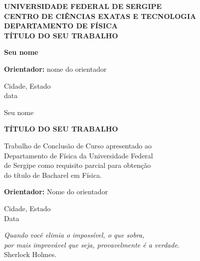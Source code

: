 \documentclass[12pt, a4paper, openright]{book}
\theoremstyle{definition}
\begin{document}
	
	\begin{titlepage}%
		\begin{center}
			\Large{\textbf{UNIVERSIDADE FEDERAL DE SERGIPE} \\
				\textbf{CENTRO DE CIÊNCIAS EXATAS E TECNOLOGIA}\\
				\textbf{DEPARTAMENTO DE FÍSICA}}\\
			\vspace{4cm}%
			{\large\textbf{TÍTULO DO SEU TRABALHO}}
			\vfill
			
			\large \textbf{Seu nome}  
			
			\vfill
			\textbf{Orientador:} nome do orientador
			
			\vspace{3cm}
			{\large Cidade, Estado} \\  
			{\large data}  
		\end{center}
	\newpage
	\thispagestyle{empty}
		\begin{center}
			{\large Seu nome}
			\vspace{3cm}
			
			{\large\textbf{TÍTULO DO SEU TRABALHO}}
			\normalsize
			\vspace{4.5cm}
			
			\begin{flushright}
				\normalsize
				\begin{minipage}{0.6\textwidth}
					Trabalho de Conclusão de Curso apresentado ao\\
					Departamento de Física da Universidade Federal\\
					de Sergipe como requisito parcial para obtenção\\
					do título de Bacharel em Física.
				\end{minipage}
			\end{flushright}
			
			\vfill
			\textbf{Orientador:} Nome do orientador
			
			\vspace{3cm}
			{\large Cidade, Estado} \\  
			{\large Data}%
		\end{center}
	\end{titlepage}
	
	
	\newpage
	\pagenumbering{roman}
	
	\thispagestyle{empty}
	\vspace*{\fill}
	\begin{flushright}
		\textit{Quando você elimia o impossível, o que sobra,\\ por mais improvável que seja, provavelmente é a verdade.}\\\vspace{.3cm}Sherlock Holmes.
	\end{flushright}
	
\end{document}
